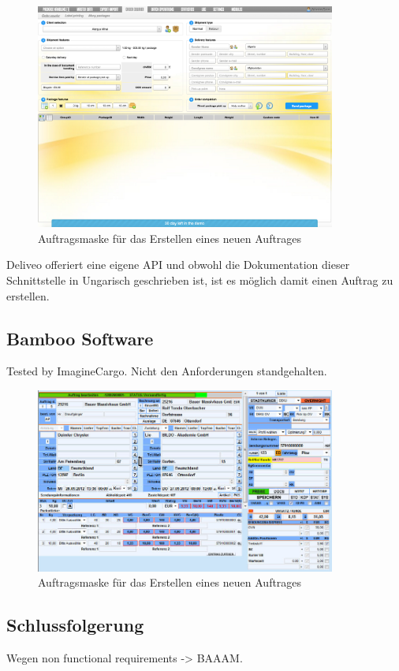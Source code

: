 \begin{figure}[ht]
	\centering
  \includegraphics[width=0.88\textwidth]{images/deliveoNew.png}
	\caption{Auftragsmaske für das Erstellen eines neuen Auftrages}
	\label{fig1:deliveonew}
\end{figure}

Deliveo offeriert eine eigene API und obwohl die Dokumentation dieser Schnittstelle in Ungarisch geschrieben ist, ist es möglich damit einen Auftrag zu erstellen.

\subsection{Bamboo Software}
Tested by ImagineCargo. Nicht den Anforderungen standgehalten.

\begin{figure}[ht]
	\centering
  \includegraphics[width=0.88\textwidth]{images/bambooNew.jpg}
	\caption{Auftragsmaske für das Erstellen eines neuen Auftrages}
	\label{fig1:bamboonew}
\end{figure}

\subsection{Schlussfolgerung}
Wegen non functional requirements -> BAAAM.